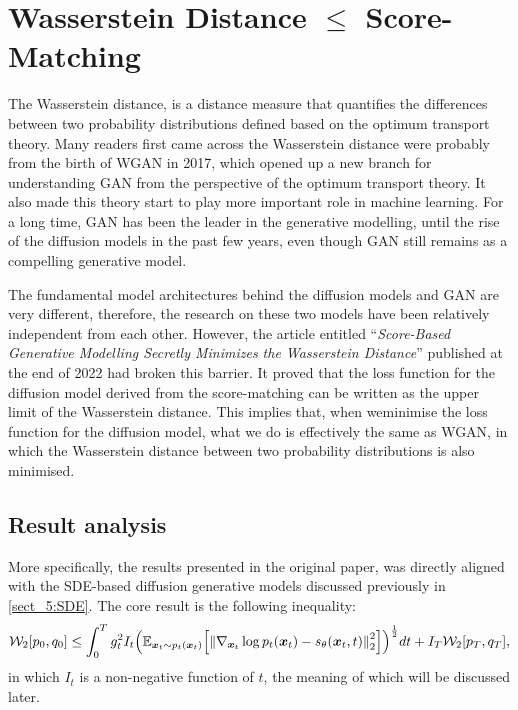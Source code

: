 \section{Wasserstein Distance $\leq$ Score-Matching}
\label{sect_16}

The Wasserstein distance, is a distance measure that quantifies the differences between two probability distributions defined based on the optimum transport theory. Many readers first came across the Wasserstein distance were probably from the birth of WGAN in 2017, which opened up a new branch for understanding GAN from the perspective of the optimum transport theory. It also made this theory start to play more important role in machine learning. For a long time, GAN has been the leader in the generative modelling, until the rise of the diffusion models in the past few years, even though GAN still remains as a compelling generative model.

The fundamental model architectures behind the diffusion models and GAN are very different, therefore, the research on these two models have been relatively independent from each other. However, the article entitled ``\textit{Score-Based Generative Modelling Secretly Minimizes the Wasserstein Distance}''\cite{kwon2022score} published at the end of 2022 had broken this barrier. It proved that the loss function for the diffusion model derived from the score-matching can be written as the upper limit of the Wasserstein distance. This implies that, when weminimise the loss function for the diffusion model, what we do is effectively the same as WGAN, in which the Wasserstein distance between two probability distributions is also minimised.

\subsection{Result analysis}

More specifically, the results presented in the original paper, was directly aligned with the SDE-based diffusion generative models discussed previously in \cref{sect_5:SDE}. The core result is the following inequality:
\begin{equation}
    \label{eq:16.1}
    \mathcal{W}_{2}[p_0,q_0]\leq \int_0^T g_t^2 I_t\Bigl( \mathbb{E}_{\bm{x}_{t}\sim p_t (\bm{x}_{t})} \Bigl[ \left\|\nabla_{\bm{x}_{t}}\log p_{t}(\bm{x}_{t})-s_{\theta}(\bm{x}_{t},t)\right\|_2^2\Bigr]\Bigr)^{\frac{1}{2}}dt+I_T\mathcal{W}_2[p_T,q_T],
\end{equation}
in which $I_t$ is a non-negative function of $t$, the meaning of which will be discussed later. 

